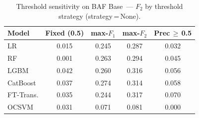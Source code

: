 \begin{table}[H]
\centering
\caption{Threshold sensitivity on BAF Base~--- $F_2$ by threshold strategy (strategy\,=\,None).}
\label{tab:threshold_baf_f2}
\begin{tabular}{l c c c c}
\toprule
Model & Fixed (0.5) & max-$F_1$ & max-$F_2$ & Prec\,$\geq$\,0.5 \\
\midrule
LR         & 0.015 & 0.245 & 0.287 & 0.032 \\
RF         & 0.001 & 0.263 & 0.294 & 0.045 \\
LGBM       & 0.042 & 0.260 & 0.316 & 0.056 \\
CatBoost   & 0.037 & 0.274 & 0.314 & 0.058 \\
FT-Trans.  & 0.035 & 0.244 & 0.317 & 0.070 \\
OCSVM      & 0.031 & 0.071 & 0.081 & 0.000 \\
\bottomrule
\end{tabular}
\end{table}